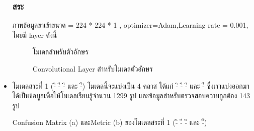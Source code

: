 \documentclass[12pt,oneside,openright,a4paper]{cpe-thai-project}
\begin{document}
\begin{itemize}
      \subsubsection{สระ}
      ภาพข้อมูลขาเข้าขนาด = 224 * 224 * 1 , 
optimizer=Adam,Learning rate = 0.001, โดยมี layer ดังนี้
\begin{figure}[!ht]\centering
  \setlength{\fboxrule}{0.2mm} %
  \setlength{\fboxsep}{1cm}
  \caption{โมเดลสำหรับตัวอักษร}\label{fig:modelarchitecture}
 \end{figure}
 \begin{figure}[!ht]\centering
  \setlength{\fboxrule}{0.2mm} %
  \setlength{\fboxsep}{1cm}
  \caption{Convolutional Layer สำหรับโมเดลตัวอักษร}\label{fig:convolutionallayer}
 \end{figure}
       \item โมเดลสระที่ 1 (-ิ -ี -ึ และ -ื)
       โมเดลนี้จะแบ่งเป็น 4 คลาส ได้แก่ -ิ -ี -ึ และ -ื ซึ่งเราแบ่งออกมาได้เป็นข้อมูลเพื่อให้โมเดลเรียนรู้จำนวน 1299 รูป และข้อมูลสำหรับตรวจสอบความถูกต้อง 143 รูป
       \begin{table}[!ht]
        \caption{Confusion Matrix (a) และMetric (b) ของโมเดลสระที่ 1 (-ิ -ี -ึ และ -ื)}
        \begin{subtable}{.5\linewidth}
        \centering
        \caption{}
        

\end{subtable}
\end{table}
\end{itemize}
\end{document}
